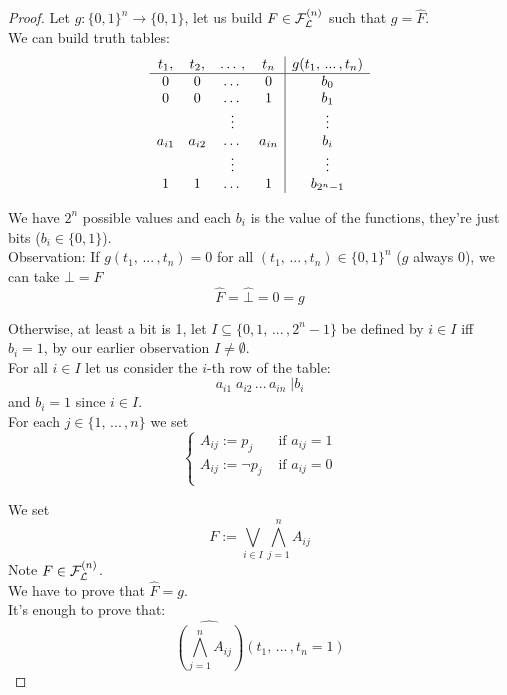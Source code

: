 	\begin{proof}
		Let $g: \{0,1\}^n \rightarrow \{0,1\}$, let us build $F \in \mathcal{F}_\mathcal{L}^{(n)}$ such that $g = \hat F$.\\
		We can build truth tables:
		$$
		\begin{array}{c c c c | c}
			t_1, & t_2, & \dots \, , & t_n & g (t_1, \, ... \, , t_n) \\
			\hline
			0 & 0 & \dots & 0 & b_0 \\
			0 & 0 & \dots & 1 & b_1 \\
			&& \vdots && \vdots \\
			a_{i1} & a_{i2} & \dots & a_{in} & b_i \\
			&& \vdots && \vdots \\
			1 & 1 & \dots & 1 & b_{2^{n}-1} \\
		\end{array}
		$$

		We have $2^n$ possible values and each $b_i$ is the value of the functions, they're just bits ($b_i \in \{0,1\}$).\\

		Observation: If $g(t_1, \, ... \, , t_n) = 0$ for all $(t_1, \, ... \, , t_n) \in \{0,1\}^n$ ($g$ always $0$), we can take $\bot = F$
		$$ \hat F = \hat \bot = 0 = g $$

		Otherwise, at least a bit is 1, let $I \subseteq \{0,1, \, ... \, , 2^{n}-1\}$ be defined by $i \in I$ iff $b_i = 1$, by our earlier observation $I \neq \emptyset$.\\

		For all $i \in I$ let us consider the $i$-th row of the table:
		$$ a_{i1} \; a_{i2} \, ... \, a_{in} \; | b_i $$
		and $b_i =1$ since $i \in I$.\\

		For each $j \in \{1, \, ... \, , n\}$ we set
		$$
		\begin{cases}
			A_{ij}:= p_j & \text{ if } a_{ij} = 1 \\
			A_{ij}:= \neg p_j & \text{ if } a_{ij} = 0 \\
		\end{cases}
		$$

		We set
		$$ F := \bigvee_{i \in I} \bigwedge_{j=1}^n A_{ij} $$
		Note $F \in \mathcal{F}_\mathcal{L}^{(n)}$.\\

		We have to prove that $\hat F = g$.\\

		It's enough to prove that:
		$$\widehat{\left(\bigwedge_{j=1}^n A_{ij}\right)} (t_1, \, ... \, , t_n = 1) $$


\end{proof}
